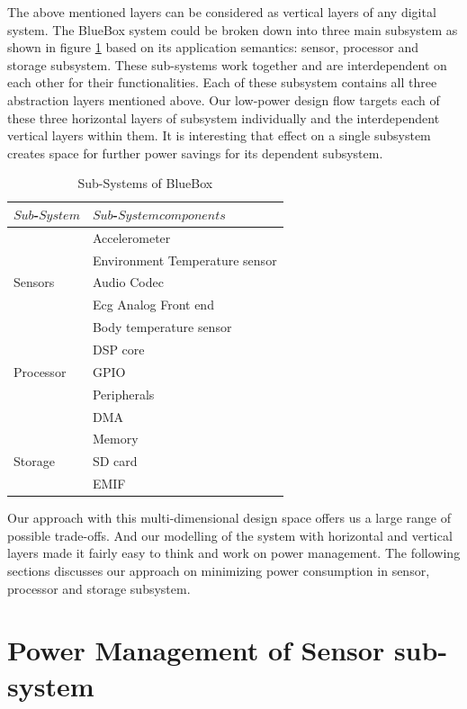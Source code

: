  
 The above mentioned layers can be considered as vertical layers of any digital system. The BlueBox system could be broken down into three main subsystem as shown in figure \ref{table:sub-system} based on its application semantics: sensor, processor and storage subsystem. These sub-systems work together and are interdependent on each other for their functionalities. Each of these subsystem contains  all three abstraction layers mentioned above. Our low-power design flow targets each of these three horizontal layers of subsystem individually and the interdependent  vertical layers within them. It is interesting that effect on a single subsystem creates space for further power savings for its dependent subsystem. 
 
  \begin{table}
 	\centering
 	\begin{tabular}{|l|l|}
 		\hline
 		$Sub$-$System$ & $Sub$-$System  components$  \\
 		\hline
 		& Accelerometer \\
 		& Environment Temperature sensor \\
 		Sensors & Audio Codec \\
 		& Ecg Analog Front end \\
 		& Body temperature sensor\\
 		\hline
 		& DSP core \\
 		Processor & GPIO \\
 		& Peripherals \\
 		& DMA \\
 		& Memory \\
 		\hline
 		Storage & SD card \\
 		& EMIF \\
 		\hline
 	\end{tabular}
 	\caption{Sub-Systems of BlueBox}
 	\label{table:sub-system}
 \end{table}
 
 
 Our approach with this multi-dimensional design space offers us a large range of possible trade-offs. And our modelling of the system with horizontal and vertical layers made it fairly easy to think and work on power management.
 The following sections discusses our approach on minimizing power consumption in sensor, processor and storage subsystem.
 
 \section{Power Management of Sensor sub-system}
 
